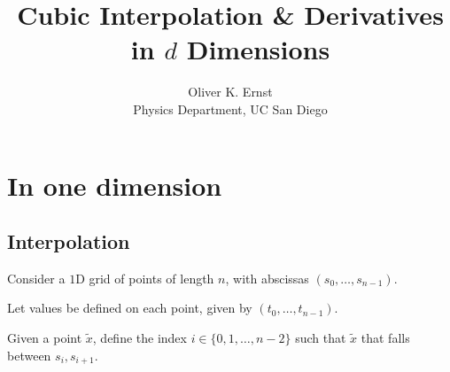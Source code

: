 \documentclass[11pt]{article}
\title{Cubic Interpolation \& Derivatives in $d$ Dimensions}
\author{Oliver K. Ernst \\ Physics Department, UC San Diego}
\begin{document}
\maketitle

\tableofcontents


\section{In one dimension}



\subsection{Interpolation}


Consider a $1$D grid of points of length $n$, with abscissas $(s_0, \dots, s_{n-1})$.

Let values be defined on each point, given by $(t_0,\dots,t_{n-1})$.

Given a point $\tilde{x}$, define the index $i \in \{ 0,1, \dots, n-2 \}$ such that $\tilde{x}$ that falls between $s_i, s_{i+1}$.
\end{document}
